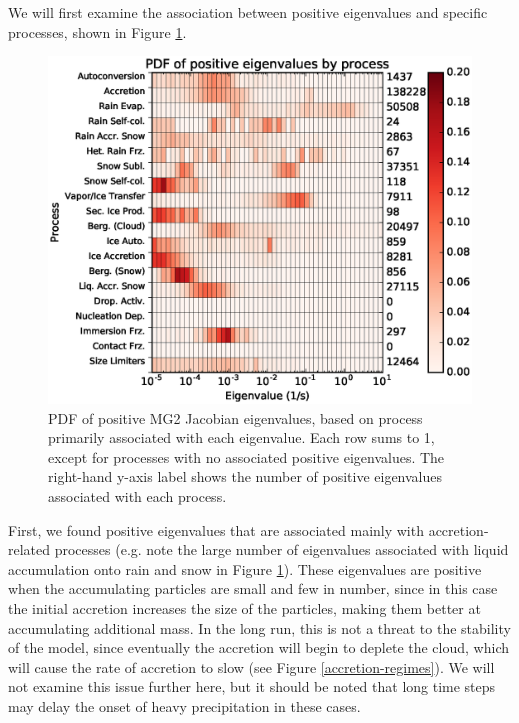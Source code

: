 \documentclass [11pt, proquest] {uwthesis}[2020/02/24]
\begin{document}
We will first examine the association between positive eigenvalues and specific processes, shown in Figure \ref{process-2D-pos-eig}.

\begin{figure}[ht]
  \includegraphics[width=6.5in]{./time_hist_process_2D_pos.eps}
  \caption{PDF of positive MG2 Jacobian eigenvalues, based on process primarily associated with each eigenvalue. Each row sums to \num{1}, except for processes with no associated positive eigenvalues. The right-hand y-axis label shows the number of positive eigenvalues associated with each process.}
  \label{process-2D-pos-eig}
\end{figure}

First, we found positive eigenvalues that are associated mainly with accretion-related processes (e.g. note the large number of eigenvalues associated with liquid accumulation onto rain and snow in Figure \ref{process-2D-pos-eig}). These eigenvalues are positive when the accumulating particles are small and few in number, since in this case the initial accretion increases the size of the particles, making them better at accumulating additional mass. In the long run, this is not a threat to the stability of the model, since eventually the accretion will begin to deplete the cloud, which will cause the rate of accretion to slow (see Figure \ref{accretion-regimes}). We will not examine this issue further here, but it should be noted that long time steps may delay the onset of heavy precipitation in these cases.
\end{document}
